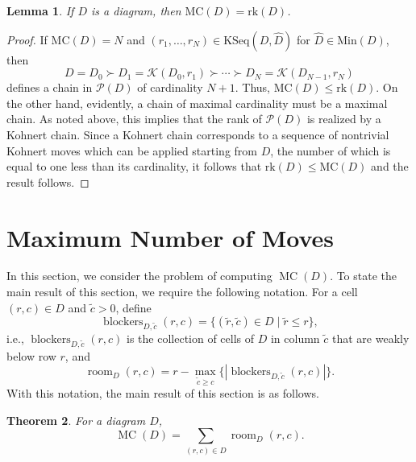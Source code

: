 \documentclass[letterpaper,10pt]{article}
\newtheorem{theorem}{Theorem}[section]
\newtheorem{lemma}[theorem]{Lemma}
\newtheorem{remark}[theorem]{Remark}
\newcommand{\rn}[1]{{\color{red} #1}}
\DeclareMathOperator{\MC}{MC}
\DeclareMathOperator{\room}{room}
\DeclareMathOperator{\blockers}{blockers}
\begin{document}
\begin{lemma}\label{lem:poset}
    If $D$ is a diagram, then $\mathrm{MC}(D)=\mathrm{rk}(D)$.
\end{lemma}
\begin{proof}
    If $\mathrm{MC}(D)=N$ and $(r_1,\hdots,r_N)\in \mathrm{KSeq}(D,\widehat{D})$ for $\widehat{D}\in\mathrm{Min}(D)$, then $$D=D_0\succ D_1=\mathcal{K}(D_0,r_1)\succ\cdots\succ D_N=\mathcal{K}(D_{N-1},r_N)$$ defines a chain in $\mathcal{P}(D)$ of cardinality $N+1$. Thus, $\mathrm{MC}(D)\le \mathrm{rk}(D)$. On the other hand, evidently, a chain of maximal cardinality must be a maximal chain. As noted above, this implies that the rank of $\mathcal{P}(D)$ is realized by a Kohnert chain. Since a Kohnert chain corresponds to a sequence of nontrivial Kohnert moves which can be applied starting from $D$, the number of which is equal to one less than its cardinality, it follows that $\mathrm{rk}(D)\le \mathrm{MC}(D)$ and the result follows.
\end{proof}



\section{Maximum Number of Moves}\label{sec:max}

In this section, we consider the problem of computing $\MC(D)$. To state the main result of this section, we require the following notation. For a cell $(r, c) \in D$ and $\tilde{c} > 0$, define 
\[\blockers_{D, \tilde{c}}(r, c) = \{(\tilde{r}, \tilde{c}) \in D \mid \tilde{r} \leq r\},\]
i.e., $\blockers_{D,\tilde{c}}(r, c)$ is the collection of cells of $D$ in column $\tilde{c}$ that are weakly below row $r$, and
\[\room_D(r, c) = r - \max_{\tilde{c} \geq c} \{|\blockers_{D, \tilde{c}}(r, c)|\}.\] With this notation, the main result of this section is as follows.

\begin{theorem}\label{thm:max}
    For a diagram $D$,
    \[\MC(D) = \sum_{(r, c) \in D} \room_D(r, c).\]
\end{theorem}
\end{document}
